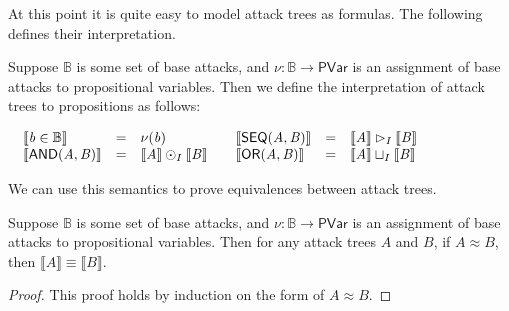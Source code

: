 \documentclass{llncs}
\let\mto\to
\let\to\relax
\newcommand{\to}{\rightarrow}
\newcommand{\interp}[1]{\llbracket #1 \rrbracket}
\newcommand{\ATermsnt}[1]{\mathit{#1}}
\newcommand{\ATermsmv}[1]{\mathit{#1}}
\begin{document}
At this point it is quite easy to model attack trees as formulas.  The
following defines their interpretation.
\begin{definition}
  \label{def:interp-aterms-quaternary}
  Suppose $\mathbb{B}$ is some set of base attacks, and $\nu :
  \mathbb{B} \mto \mathsf{PVar}$ is an assignment of base attacks to
  propositional variables.  Then we define the interpretation of
  attack trees to propositions as follows:
  \begin{center}
    \begin{math}
      \setlength{\arraycolsep}{5px}
      \begin{array}{lll}
        \begin{array}{lll}
          \interp{\ATermsmv{b} \in \mathbb{B}} & = & \nu(\ATermsmv{b})\\
          \interp{ \mathsf{AND}( \ATermsnt{A} , \ATermsnt{B} ) } & = & \interp{\ATermsnt{A}} \odot_I \interp{\ATermsnt{B}}
        \end{array}
        &
        \begin{array}{lll}
          \interp{ \mathsf{SEQ}( \ATermsnt{A} , \ATermsnt{B} ) } & = & \interp{\ATermsnt{A}} \rhd_I \interp{\ATermsnt{B}}\\
          \interp{ \mathsf{OR}( \ATermsnt{A} , \ATermsnt{B} ) } & = & \interp{\ATermsnt{A}} \sqcup_I \interp{\ATermsnt{B}}
        \end{array}
      \end{array}
    \end{math}
  \end{center}
\end{definition}
We can use this semantics to prove equivalences between attack trees.
\begin{lemma}
  \label{lemma:equivalence_of_attack_trees}
  Suppose $\mathbb{B}$ is some set of base attacks, and $\nu :
  \mathbb{B} \mto \mathsf{PVar}$ is an assignment of base attacks to
  propositional variables.  Then for any attack trees $\ATermsnt{A}$ and
  $\ATermsnt{B}$, if $ \ATermsnt{A}  \approx  \ATermsnt{B} $, then $\interp{\ATermsnt{A}} \equiv
  \interp{\ATermsnt{B}}$.
\end{lemma}
\begin{proof}
  This proof holds by induction on the form of $ \ATermsnt{A}  \approx  \ATermsnt{B} $.
\end{proof}

\end{document}
